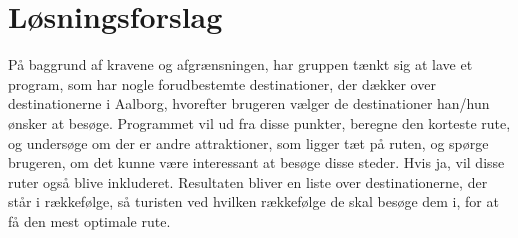 \section{Løsningsforslag}
På baggrund af kravene og afgrænsningen, har gruppen tænkt sig at lave et program, som har nogle forudbestemte destinationer, der dækker over destinationerne i Aalborg, hvorefter brugeren vælger de destinationer han/hun ønsker at besøge. Programmet vil ud fra disse punkter, beregne den korteste rute, og undersøge om der er andre attraktioner, som ligger tæt på ruten, og spørge brugeren, om det kunne være interessant at besøge disse steder. Hvis ja, vil disse ruter også blive inkluderet. Resultaten bliver en liste over destinationerne, der står i rækkefølge, så turisten ved hvilken rækkefølge de skal besøge dem i, for at få den mest optimale rute.

